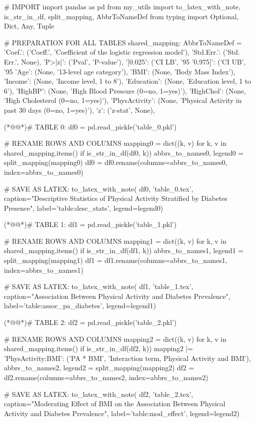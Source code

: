 \documentclass[11pt]{article}
\begin{document}
\begin{python}

# IMPORT
import pandas as pd
from my_utils import to_latex_with_note, is_str_in_df, split_mapping, AbbrToNameDef
from typing import Optional, Dict, Any, Tuple

# PREPARATION FOR ALL TABLES
shared_mapping: AbbrToNameDef = {
    'Coef.': ('Coeff.', 'Coefficient of the logistic regression model'),
    'Std.Err.': ('Std. Err.', None),
    'P>|z|': ('Pval', 'P-value'),
    '[0.025': ('CI LB', '95%
    '0.975]': ('CI UB', '95%
    'Age': (None, '13-level age category'),
    'BMI': (None, 'Body Mass Index'),
    'Income': (None, 'Income level, 1 to 8'),
    'Education': (None, 'Education level, 1 to 6'),
    'HighBP': (None, 'High Blood Pressure (0=no, 1=yes)'),
    'HighChol': (None, 'High Cholesterol (0=no, 1=yes)'),
    'PhysActivity': (None, 'Physical Activity in past 30 days (0=no, 1=yes)'),
    'z': ('z-stat', None),
}

(*@@*)# TABLE 0:
df0 = pd.read_pickle('table_0.pkl')

# RENAME ROWS AND COLUMNS
mapping0 = dict((k, v) for k, v in shared_mapping.items() if is_str_in_df(df0, k)) 
abbrs_to_names0, legend0 = split_mapping(mapping0)
df0 = df0.rename(columns=abbrs_to_names0, index=abbrs_to_names0)

# SAVE AS LATEX:
to_latex_with_note(
    df0, 'table_0.tex',
    caption="Descriptive Statistics of Physical Activity Stratified by Diabetes Presence", 
    label='table:desc_stats',
    legend=legend0)


(*@@*)# TABLE 1:
df1 = pd.read_pickle('table_1.pkl')

# RENAME ROWS AND COLUMNS
mapping1 = dict((k, v) for k, v in shared_mapping.items() if is_str_in_df(df1, k)) 
abbrs_to_names1, legend1 = split_mapping(mapping1)
df1 = df1.rename(columns=abbrs_to_names1, index=abbrs_to_names1)

# SAVE AS LATEX:
to_latex_with_note(
    df1, 'table_1.tex',
    caption="Association Between Physical Activity and Diabetes Prevalence", 
    label='table:assoc_pa_diabetes',
    legend=legend1)


(*@@*)# TABLE 2:
df2 = pd.read_pickle('table_2.pkl')

# RENAME ROWS AND COLUMNS
mapping2 = dict((k, v) for k, v in shared_mapping.items() if is_str_in_df(df2, k)) 
mapping2 |= {
    'PhysActivity:BMI': ('PA * BMI', 'Interaction term, Physical Activity and BMI'),
}
abbrs_to_names2, legend2 = split_mapping(mapping2)
df2 = df2.rename(columns=abbrs_to_names2, index=abbrs_to_names2)

# SAVE AS LATEX:
to_latex_with_note(
    df2, 'table_2.tex',
    caption="Moderating Effect of BMI on the Association Between Physical Activity and Diabetes Prevalence", 
    label='table:mod_effect',
    legend=legend2)

\end{python}
\end{document}
